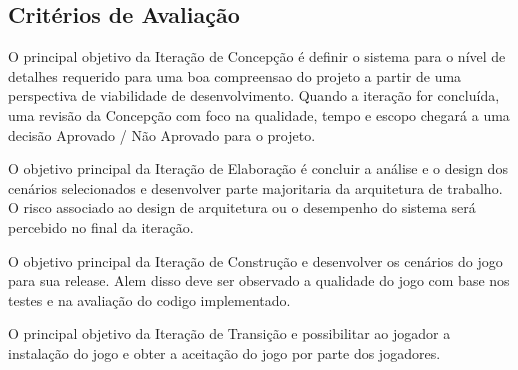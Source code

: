 \subsection{Critérios de Avaliação}

O principal objetivo da Iteração de Concepção é definir o sistema para o nível de detalhes requerido para uma boa compreensao do projeto a partir de uma perspectiva de viabilidade de desenvolvimento. Quando a iteração for concluída, uma revisão da Concepção com foco na qualidade, tempo e escopo chegará a uma decisão Aprovado / Não Aprovado para o projeto.

O objetivo principal da Iteração de Elaboração é concluir a análise e o design dos cenários selecionados e desenvolver parte majoritaria da arquitetura de trabalho. O risco associado ao design de arquitetura ou o desempenho do sistema será percebido no final da iteração. 

O objetivo principal da Iteração de Construção e desenvolver os cenários do jogo para sua release. Alem disso deve ser observado a qualidade do jogo com base nos testes e na avaliação do codigo implementado.

O principal objetivo da Iteração de Transição e possibilitar ao jogador a instalação do jogo e obter a aceitação do jogo por parte dos jogadores.
